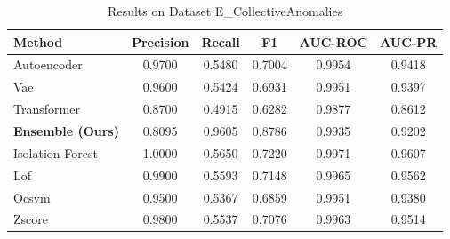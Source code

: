 \begin{table}[htbp]
\caption{Results on Dataset E_CollectiveAnomalies}
\begin{center}
\begin{tabular}{|l|c|c|c|c|c|}
\hline
\textbf{Method} & \textbf{Precision} & \textbf{Recall} & \textbf{F1} & \textbf{AUC-ROC} & \textbf{AUC-PR} \\
\hline
Autoencoder & 0.9700 & 0.5480 & 0.7004 & 0.9954 & 0.9418 \\
Vae & 0.9600 & 0.5424 & 0.6931 & 0.9951 & 0.9397 \\
Transformer & 0.8700 & 0.4915 & 0.6282 & 0.9877 & 0.8612 \\
\hline
\textbf{Ensemble (Ours)} & 0.8095 & 0.9605 & 0.8786 & 0.9935 & 0.9202 \\
Isolation Forest & 1.0000 & 0.5650 & 0.7220 & 0.9971 & 0.9607 \\
Lof & 0.9900 & 0.5593 & 0.7148 & 0.9965 & 0.9562 \\
Ocsvm & 0.9500 & 0.5367 & 0.6859 & 0.9951 & 0.9380 \\
Zscore & 0.9800 & 0.5537 & 0.7076 & 0.9963 & 0.9514 \\
\hline
\hline
\end{tabular}
\label{tab:results_e_collectiveanomalies}
\end{center}
\end{table}